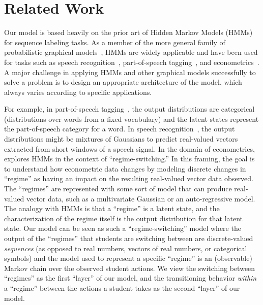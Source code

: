 \section{Related Work}

Our model is based heavily on the prior art of Hidden Markov Models
(HMMs)~\cite{Rabiner:1990:RSR} for sequence labeling tasks. As a member of
the more general family of probabilistic graphical
models~\cite{Koller:2009:PGM}, HMMs are widely applicable and have been
used for tasks such as speech recognition~\cite{Huang:1990:HMM},
part-of-speech tagging~\cite{Jurafsky:2009:SLP}, and
econometrics~\cite{Hamilton:1990:JoE}. A major challenge in applying HMMs
and other graphical models successfully to solve a problem is to design an
appropriate architecture of the model, which always varies according to
specific applications.

For example, in part-of-speech tagging~\cite{Jurafsky:2009:SLP}, the output
distributions are categorical (distributions over words from a fixed
vocabulary) and the latent states represent the part-of-speech category for
a word. In speech recognition~\cite{Huang:1990:HMM}, the output
distributions might be mixtures of Gaussians to predict real-valued vectors
extracted from short windows of a speech signal. In the domain of
econometrics, \citet{Hamilton:1990:JoE} explores HMMs in the context of
``regime-switching.'' In this framing, the goal is to understand how
econometric data changes by modeling discrete changes in ``regime'' as
having an impact on the resulting real-valued vector data observed. The
``regimes'' are represented with some sort of model that can produce
real-valued vector data, such as a multivariate Gaussian or an
auto-regressive model. The analogy with HMMs is that a ``regime'' is a
latent state, and the characterization of the regime itself is the output
distribution for that latent state. Our model can be seen as such a
``regime-switching'' model where the output of the ``regimes'' that
students are switching between are discrete-valued \emph{sequences} (as
opposed to real numbers, vectors of real numbers, or categorical symbols)
and the model used to represent a specific ``regime'' is an (observable)
Markov chain over the observed student actions. We view the switching
between ``regimes'' as the first ``layer'' of our model, and the
transitioning behavior \emph{within} a ``regime'' between the actions a
student takes as the second ``layer'' of our model.

